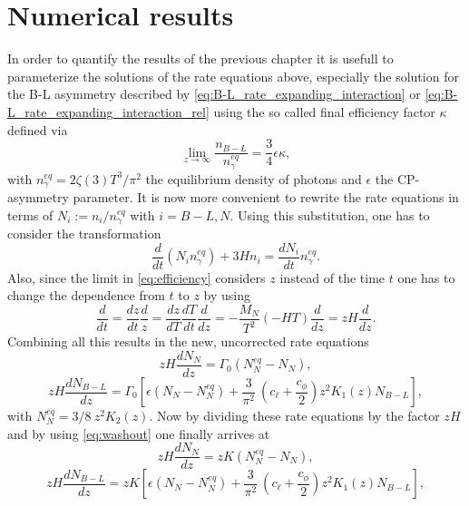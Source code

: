 \chapter{Numerical results} \label{sec:num_results}
In order to quantify the results of the previous chapter it is usefull to parameterize the solutions of the rate equations above, especially the solution for the B-L asymmetry described by \eqref{eq:B-L_rate_expanding_interaction} or \eqref{eq:B-L_rate_expanding_interaction_rel} using the so called final efficiency factor $\kappa$ defined via
\begin{equation}
\lim\limits_{z\rightarrow\infty}\frac{n_{B-L}}{n_\gamma^{eq}}=\frac{3}{4}\epsilon\kappa,
\label{eq:efficiency}
\end{equation}
with $n_\gamma^{eq}=2\zeta(3)T^3/\pi^2$ the equilibrium density of photons and $\epsilon$ the CP-asymmetry parameter. It is now more convenient to rewrite the rate equations in terms of $N_i:=n_i/n_\gamma^{eq}$ with $i=B-L,N$. Using this substitution, one has to consider the transformation \cite[Eq. 7.1]{Wormann:2016yyi}
\begin{equation}
\frac{d}{dt}(N_in_\gamma^{eq})+3Hn_i=\frac{dN_i}{dt}n_\gamma^{eq}.
\end{equation}
Also, since the limit in \eqref{eq:efficiency} considers $z$ instead of the time $t$ one has to change the dependence from $t$ to $z$ by using
\begin{equation}
\frac{d}{dt}=\frac{dz}{dt}\frac{d}{z}=\frac{dz}{dT}\frac{dT}{dt}\frac{d}{dz}=-\frac{M_N}{T^2}(-HT)\frac{d}{dz}=zH\frac{d}{dz}.
\end{equation}
Combining all this results in the new, uncorrected rate equations
\begin{equation*}
zH\frac{dN_N}{dz}=\Gamma_0\left(N_N^{eq}-N_N\right),
\end{equation*}
\begin{equation*}
zH\frac{dN_{B-L}}{dz}=\Gamma_0\left[\epsilon\left(N_N-N_N^{eq}\right)+\frac{3}{\pi^2}\:\left(c_\ell+\frac{c_\phi}{2}\right)z^2K_1(z)N_{B-L}\right],
\end{equation*}
with $N_N^{eq}=3/8\:z^2K_2(z)$.
Now by dividing these rate equations by the factor $zH$ and by using \eqref{eq:washout} one finally arrives at
\begin{equation}
zH\frac{dN_N}{dz}=zK\left(N_N^{eq}-N_N\right),
\end{equation}
\begin{equation}
zH\frac{dN_{B-L}}{dz}=zK\left[\epsilon\left(N_N-N_N^{eq}\right)+\frac{3}{\pi^2}\:\left(c_\ell+\frac{c_\phi}{2}\right)z^2K_1(z)N_{B-L}\right],
\end{equation}\newpage
